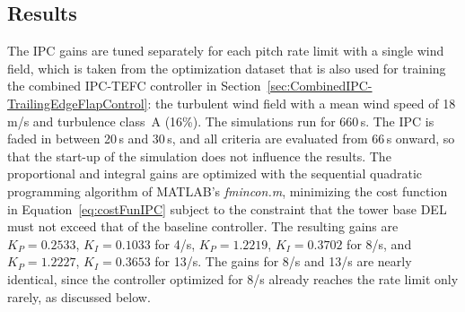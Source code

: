 \subsection{Results} \label{subsection: IPCResults}
The IPC gains are tuned separately for each pitch rate limit with a single wind field, which is taken from the optimization dataset that is also used for training the combined IPC-TEFC controller in Section~\ref{sec:CombinedIPC-TrailingEdgeFlapControl}: the turbulent wind field with a mean wind speed of 18\,m/s and turbulence class~A (16\%). The simulations run for 660\,s. The IPC is faded in between 20\,s and 30\,s, and all criteria are evaluated from 66\,s onward, so that the start-up of the simulation does not influence the results. The proportional and integral gains are optimized with the sequential quadratic programming algorithm of MATLAB's \textit{fmincon.m}, minimizing the cost function in Equation~\eqref{eq:costFunIPC} subject to the constraint that the tower base DEL must not exceed that of the baseline controller. The resulting gains are $K_P = 0.2533$, $K_I = 0.1033$ for 4\textdegree/s, $K_P = 1.2219$, $K_I = 0.3702$ for 8\textdegree/s, and $K_P = 1.2227$, $K_I = 0.3653$ for 13\textdegree/s. The gains for 8\textdegree/s and 13\textdegree/s are nearly identical, since the controller optimized for 8\textdegree/s already reaches the rate limit only rarely, as discussed below.

